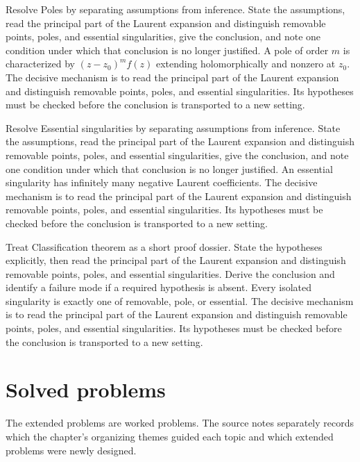 \begin{example}\label{ex:iv09-worked-02}
Resolve Poles by separating assumptions from inference. State the assumptions, read the principal part of the Laurent expansion and distinguish removable points, poles, and essential singularities, give the conclusion, and note one condition under which that conclusion is no longer justified. A pole of order $m$ is characterized by $(z-z_0)^mf(z)$ extending holomorphically and nonzero at $z_0$. The decisive mechanism is to read the principal part of the Laurent expansion and distinguish removable points, poles, and essential singularities. Its hypotheses must be checked before the conclusion is transported to a new setting.
\end{example}

\begin{example}\label{ex:iv09-worked-03}
Resolve Essential singularities by separating assumptions from inference. State the assumptions, read the principal part of the Laurent expansion and distinguish removable points, poles, and essential singularities, give the conclusion, and note one condition under which that conclusion is no longer justified. An essential singularity has infinitely many negative Laurent coefficients. The decisive mechanism is to read the principal part of the Laurent expansion and distinguish removable points, poles, and essential singularities. Its hypotheses must be checked before the conclusion is transported to a new setting.
\end{example}

\begin{example}\label{ex:iv09-worked-04}
Treat Classification theorem as a short proof dossier. State the hypotheses explicitly, then read the principal part of the Laurent expansion and distinguish removable points, poles, and essential singularities. Derive the conclusion and identify a failure mode if a required hypothesis is absent. Every isolated singularity is exactly one of removable, pole, or essential. The decisive mechanism is to read the principal part of the Laurent expansion and distinguish removable points, poles, and essential singularities. Its hypotheses must be checked before the conclusion is transported to a new setting.
\end{example}

\section{Solved problems}
The extended problems are worked problems. The source notes separately records which the chapter's organizing themes guided each topic and which extended problems were newly designed.

